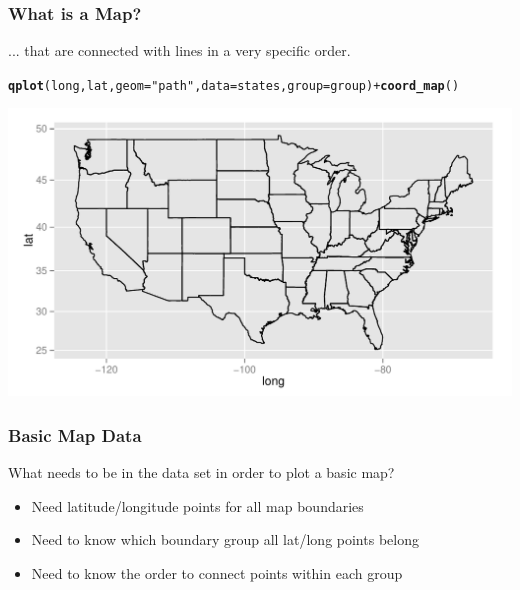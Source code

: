 \documentclass{beamer}\usepackage[]{graphicx}\usepackage[]{color}
\makeatletter
\newcommand{\hlstr}[1]{\textcolor[rgb]{0.192,0.494,0.8}{#1}}%
\newcommand{\hlopt}[1]{\textcolor[rgb]{0,0,0}{#1}}%
\newcommand{\hlstd}[1]{\textcolor[rgb]{0.345,0.345,0.345}{#1}}%
\newcommand{\hlkwc}[1]{\textcolor[rgb]{0.333,0.667,0.333}{#1}}%
\newcommand{\hlkwd}[1]{\textcolor[rgb]{0.737,0.353,0.396}{\textbf{#1}}}%
\newenvironment{kframe}{%
 \def\at@end@of@kframe{}%
 \ifinner\ifhmode%
  \def\at@end@of@kframe{\end{minipage}}%
  \begin{minipage}{\columnwidth}%
 \fi\fi%
 \def\FrameCommand##1{\hskip\@totalleftmargin \hskip-\fboxsep
 \colorbox{shadecolor}{##1}\hskip-\fboxsep
     \hskip-\linewidth \hskip-\@totalleftmargin \hskip\columnwidth}%
 \MakeFramed {\advance\hsize-\width
   \@totalleftmargin\z@ \linewidth\hsize
   \@setminipage}}%
 {\par\unskip\endMakeFramed%
 \at@end@of@kframe}
\newenvironment{knitrout}{}{} %
\makeatother
\begin{document}
\begin{frame}[fragile]
    \frametitle{What is a Map?}

... that are connected with lines in a very specific order.

\small
\begin{knitrout}\footnotesize
{}\color{fgcolor}\begin{kframe}
\begin{alltt}
\hlkwd{qplot}\hlstd{(long, lat,} \hlkwc{geom}\hlstd{=}\hlstr{"path"}\hlstd{,} \hlkwc{data}\hlstd{=states,} \hlkwc{group}\hlstd{=group)} \hlopt{+} \hlkwd{coord_map}\hlstd{()}
\end{alltt}
\end{kframe}
\includegraphics[width=\textwidth]{figure/kmapoutline} 

\end{knitrout}
    \normalsize
\end{frame}



\begin{frame}
    \frametitle{Basic Map Data}
  What needs to be in the data set in order to plot a basic map?
    \begin{itemize}
        \item Need latitude/longitude points for all map boundaries
        \item Need to know which boundary group all lat/long points belong
        \item Need to know the order to connect points within each group
    \end{itemize}    
\end{frame}

\end{document}
